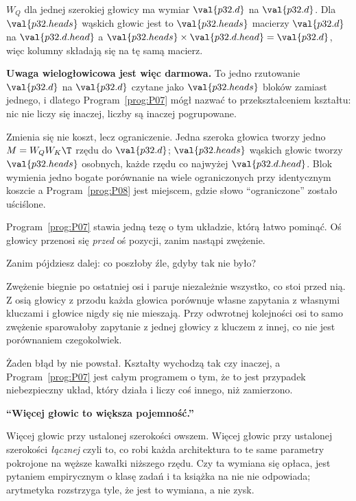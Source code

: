 \begin{fr}

$W_Q$ dla jednej szerokiej głowicy ma wymiar $\val{p32.d}$ na
$\val{p32.d}$. Dla $\val{p32.heads}$ wąskich głowic jest to
$\val{p32.heads}$ macierzy $\val{p32.d}$ na $\val{p32.d.head}$ \dash{} a
$\val{p32.heads} \times \val{p32.d.head} = \val{p32.d}$, więc kolumny składają
się na tę samą macierz.

\textbf{Uwaga wielogłowicowa jest więc darmowa.} To jedno rzutowanie
$\val{p32.d}$ na $\val{p32.d}$ czytane jako $\val{p32.heads}$ bloków zamiast
jednego, i dlatego Program~\ref{prog:P07} mógł nazwać to przekształceniem
kształtu: nic nie liczy się inaczej, liczby są inaczej pogrupowane.

Zmienia się nie koszt, lecz ograniczenie. Jedna szeroka głowica tworzy jedno
$M = W_Q W_K\T$ rzędu do $\val{p32.d}$; $\val{p32.heads}$ wąskich głowic
tworzy $\val{p32.heads}$ osobnych, każde rzędu co najwyżej
$\val{p32.d.head}$. Blok wymienia jedno bogate porównanie na wiele
ograniczonych przy identycznym koszcie \dash{} a Program~\ref{prog:P08} jest
miejscem, gdzie słowo \enquote{ograniczone} zostało uściślone.

Program~\ref{prog:P07} stawia jedną tezę o tym układzie, którą łatwo pominąć.
Oś głowicy przenosi się \emph{przed} oś pozycji, zanim nastąpi zwężenie.

Zanim pójdziesz dalej: co poszłoby źle, gdyby tak nie było?
\dotline
\nextframe
\end{fr}

\begin{fr}

Zwężenie biegnie po ostatniej osi i paruje niezależnie wszystko, co stoi
przed nią. Z osią głowicy z przodu każda głowica porównuje własne zapytania z
własnymi kluczami i głowice nigdy się nie mieszają. Przy odwrotnej kolejności
osi to samo zwężenie sparowałoby zapytanie z jednej głowicy z kluczem z
innej, co nie jest porównaniem czegokolwiek.

Żaden błąd by nie powstał. Kształty wychodzą tak czy inaczej, a
Program~\ref{prog:P07} jest całym programem o tym, że to jest przypadek
niebezpieczny \dash{} układ, który działa i liczy coś innego, niż zamierzono.

\begin{trapbox}
\textbf{\enquote{Więcej głowic to większa pojemność.}}

Więcej głowic przy ustalonej szerokości \dash{} owszem. Więcej głowic przy
ustalonej szerokości \emph{łącznej} \dash{} czyli to, co robi każda
architektura \dash{} to te same parametry pokrojone na węższe kawałki
niższego rzędu. Czy ta wymiana się opłaca, jest pytaniem empirycznym o klasę
zadań i ta książka na nie nie odpowiada; arytmetyka rozstrzyga tyle, że jest
to wymiana, a nie zysk.
\end{trapbox}
\end{fr}

